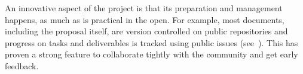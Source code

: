 An innovative aspect of the \ODK project is that its preparation and management happens,
as much as is practical in the open. For example, most documents, including the proposal
itself, are version controlled on public repositories and progress on tasks and deliverables
is tracked using public issues (see~\cite{OpenDreamKit:on}).
This has proven a strong feature to collaborate tightly with the community and get early
feedback.




